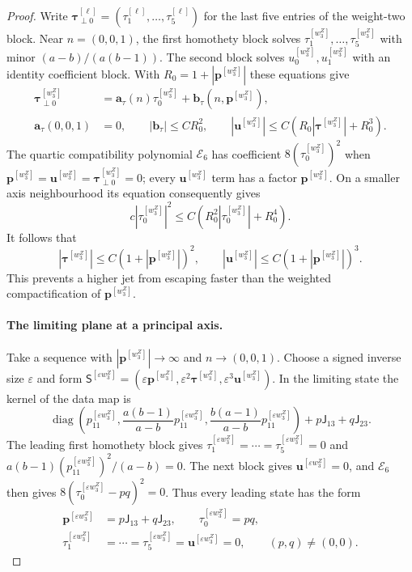 \documentclass[11pt,a4paper]{article}
\numberwithin{equation}{section}
\theoremstyle{plain}
\theoremstyle{definition}
\theoremstyle{remark}
\begin{document}
\begin{proof}
Write $\boldsymbol\tau_{\perp0}^{[\ell]}=(\tau_1^{[\ell]},\ldots,\tau_5^{[\ell]})$ for the last five entries of the weight-two block. Near $n=(0,0,1)$, the first homothety block solves $\tau_1^{[w_3^Z]},\ldots,\tau_5^{[w_3^Z]}$ with
minor $(a-b)/(a(b-1))$.  The second block solves $u_0^{[w_3^Z]},u_1^{[w_3^Z]}$ with an
identity coefficient block.  With $R_0=1+|\boldsymbol p^{[w_3^Z]}|$ these equations give
\begin{align*}
 \boldsymbol\tau_{\perp0}^{[w_3^Z]}&=\boldsymbol a_\tau(n)\tau_0^{[w_3^Z]}+
                    \boldsymbol b_\tau(n,\boldsymbol p^{[w_3^Z]}),\\
 \boldsymbol a_\tau(0,0,1)&=0,\qquad |\boldsymbol b_\tau|\le CR_0^2,\qquad
 |\boldsymbol u^{[w_3^Z]}|\le C(R_0|\boldsymbol\tau^{[w_3^Z]}|+R_0^3).
\end{align*}
The quartic compatibility polynomial $\mathcal E_6$ has coefficient $8(\tau_0^{[w_3^Z]})^2$ when
$\boldsymbol p^{[w_3^Z]}=\boldsymbol u^{[w_3^Z]}=\boldsymbol\tau_{\perp0}^{[w_3^Z]}=0$; every $\boldsymbol u^{[w_3^Z]}$ term has a factor $\boldsymbol p^{[w_3^Z]}$.  On a smaller
axis neighbourhood its equation consequently gives
\[
 c|\tau_0^{[w_3^Z]}|^2\le C(R_0^2|\tau_0^{[w_3^Z]}|+R_0^4).
\]
It follows that
\begin{equation}\label{dil:higher-bound}
             |\boldsymbol\tau^{[w_3^Z]}|\le C(1+|\boldsymbol p^{[w_3^Z]}|)^2,\qquad
             |\boldsymbol u^{[w_3^Z]}|\le C(1+|\boldsymbol p^{[w_3^Z]}|)^3.
\end{equation}
This prevents a higher jet from escaping faster than the weighted
compactification of $\boldsymbol p^{[w_3^Z]}$.

\paragraph{The limiting plane at a principal axis.}
Take a sequence with $|\boldsymbol p^{[w_3^Z]}|\to\infty$ and $n\to(0,0,1)$. Choose a signed inverse size $\varepsilon$ and form
$\mathsf S^{[\varepsilon w_3^Z]}=(\varepsilon\boldsymbol p^{[w_3^Z]},\varepsilon^2\boldsymbol\tau^{[w_3^Z]},\varepsilon^3\boldsymbol u^{[w_3^Z]})$. In the limiting state the kernel of the data map is
\[
 \operatorname{diag}\left(p_{11}^{[\varepsilon w_3^Z]},\frac{a(b-1)}{a-b}p_{11}^{[\varepsilon w_3^Z]},
                 \frac{b(a-1)}{a-b}p_{11}^{[\varepsilon w_3^Z]}\right)+p\mathsf J_{13}+q\mathsf J_{23}.
\]
The leading first homothety block gives
$\tau_1^{[\varepsilon w_3^Z]}=\cdots=\tau_5^{[\varepsilon w_3^Z]}=0$ and $a(b-1)(p_{11}^{[\varepsilon w_3^Z]})^2/(a-b)=0$.
The next block gives $\boldsymbol u^{[\varepsilon w_3^Z]}=0$, and $\mathcal E_6$ then gives
$8(\tau_0^{[\varepsilon w_3^Z]}-pq)^2=0$.  Thus every leading state has the form
\begin{equation}\label{dil:infinity-plane}
 \begin{aligned}
 \boldsymbol p^{[\varepsilon w_3^Z]}&=p\mathsf J_{13}+q\mathsf J_{23},\qquad \tau_0^{[\varepsilon w_3^Z]}=pq,\\
 \tau_1^{[\varepsilon w_3^Z]}&=\cdots=\tau_5^{[\varepsilon w_3^Z]}=\boldsymbol u^{[\varepsilon w_3^Z]}=0,\qquad (p,q)\ne(0,0).
 \end{aligned}
\end{equation}


\end{proof}
\end{document}
